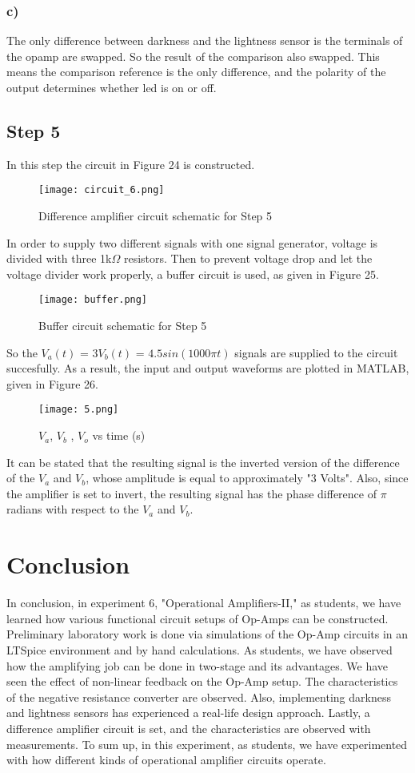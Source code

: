 \documentclass[letterpaper,12pt]{article}
\begin{document}
\subsubsection{c)}
The only difference between darkness and the lightness sensor is the terminals of the opamp are swapped. So the result of the comparison also swapped. This means the comparison reference is the only difference, and the polarity of the output determines whether led is on or off.
\subsection{Step 5}
In this step the circuit in Figure 24 is constructed.
\begin{figure}[H]
	\centering
   \texttt{[image: circuit\_6.png]}
   \caption{Difference amplifier circuit schematic for Step 5}
\end{figure}
In order to supply two different signals with one signal generator, voltage is divided with three 1k\(\Omega\) resistors. Then to prevent voltage drop and let the voltage divider work properly, a buffer circuit is used, as given in Figure 25.
\begin{figure}[H]
	\centering
   \texttt{[image: buffer.png]}
   \caption{Buffer circuit schematic for Step 5}
\end{figure}
So the \(V_a(t)\) = 3\(V_b(t)\) = \(4.5 sin(1000\pi t)\) signals are supplied to the circuit succesfully.
As a result, the input and output waveforms are plotted in MATLAB, given in Figure 26.
\begin{figure}[H]
	\centering
   \texttt{[image: 5.png]}
   \caption{\(V_{a}\), \(V_{b}\) , \(V_{o}\) vs time (s)}
\end{figure}
It can be stated that the resulting signal is the inverted version of the difference of the \(V_a\) and \(V_b\), whose amplitude is equal to approximately "3 Volts". Also, since the amplifier is set to invert, the resulting signal has the phase difference of \(\pi \) radians with respect to the \(V_a\) and \(V_b\). 
\section{Conclusion}
In conclusion, in experiment 6, "Operational Amplifiers-II," as students, we have learned how various functional circuit setups of Op-Amps can be constructed. Preliminary laboratory work is done via simulations of the Op-Amp circuits in an LTSpice environment and by hand calculations. As students, we have observed how the amplifying job can be done in two-stage and its advantages. We have seen the effect of non-linear feedback on the Op-Amp setup. The characteristics of the negative resistance converter are observed. Also, implementing darkness and lightness sensors has experienced a real-life design approach. Lastly, a difference amplifier circuit is set, and the characteristics are observed with measurements. To sum up, in this experiment, as students, we have experimented with how different kinds of operational amplifier circuits operate. 
\end{document}
